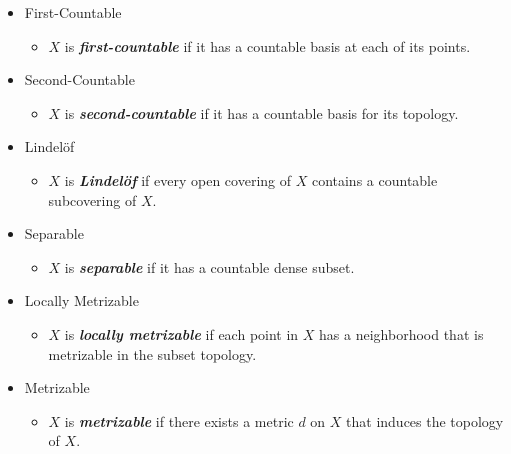 \documentclass[12pt,a4paper]{article}
\begin{document}
\begin{itemize}
        \item First-Countable
        \begin{itemize}
            \item $X$ is \textbf{\textit{first-countable}} if it has a countable basis at each of its points.
        \end{itemize}
    
        \item Second-Countable
        \begin{itemize}
            \item $X$ is \textbf{\textit{second-countable}} if it has a countable basis for its topology.
        \end{itemize}
    
        \item Lindel\"of
        \begin{itemize}
            \item $X$ is  \textbf{\textit{Lindel\"of}} if every open covering of $X$ contains a countable subcovering of $X$.
        \end{itemize}
    
        \item Separable
        \begin{itemize}
            \item $X$ is \textbf{\textit{separable}} if it has a countable dense subset.
        \end{itemize}
    
        \item Locally Metrizable
        \begin{itemize}
            \item $X$ is \textbf{\textit{locally metrizable}} if each point in $X$ has a neighborhood that is metrizable in the subset topology.
        \end{itemize}
    
        \item Metrizable
        \begin{itemize}
            \item $X$ is \textbf{\textit{metrizable}} if there exists a metric $d$ on $X$ that induces the topology of $X$.
        \end{itemize}
    \end{itemize}
    \hfill
\end{document}
